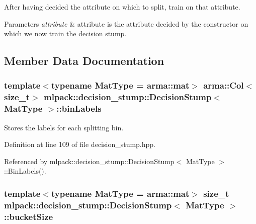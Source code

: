 After having decided the attribute on which to split, train on that attribute. 


\begin{DoxyParams}{Parameters}
{\em attribute} & attribute is the attribute decided by the constructor on which we now train the decision stump. \\
\hline
\end{DoxyParams}


\subsection{Member Data Documentation}
\subsubsection[{bin\-Labels}]{\setlength{\rightskip}{0pt plus 5cm}template$<$typename Mat\-Type = arma\-::mat$>$ arma\-::\-Col$<$size\-\_\-t$>$ {\bf mlpack\-::decision\-\_\-stump\-::\-Decision\-Stump}$<$ Mat\-Type $>$\-::bin\-Labels\hspace{0.3cm}{\ttfamily [private]}}\label{classmlpack_1_1decision__stump_1_1DecisionStump_ac56f4fc99d6f679857a0c01373613917}


Stores the labels for each splitting bin. 



Definition at line 109 of file decision\-\_\-stump.\-hpp.



Referenced by mlpack\-::decision\-\_\-stump\-::\-Decision\-Stump$<$ Mat\-Type $>$\-::\-Bin\-Labels().

\subsubsection[{bucket\-Size}]{\setlength{\rightskip}{0pt plus 5cm}template$<$typename Mat\-Type = arma\-::mat$>$ size\-\_\-t {\bf mlpack\-::decision\-\_\-stump\-::\-Decision\-Stump}$<$ Mat\-Type $>$\-::bucket\-Size\hspace{0.3cm}{\ttfamily [private]}}\label{classmlpack_1_1decision__stump_1_1DecisionStump_ac6d1a84c7b7e4058307648578d6662f3}



